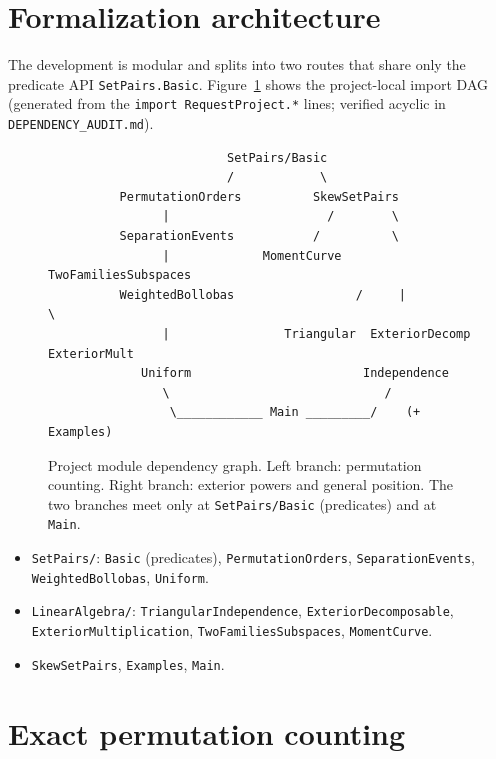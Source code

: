 \documentclass[11pt]{article}
\begin{document}
\section{Formalization architecture}\label{sec:arch}

The development is modular and splits into two routes that share only the predicate API
\lstinline{SetPairs.Basic}. Figure~\ref{fig:dep} shows the project-local import DAG
(generated from the \lstinline{import RequestProject.*} lines; verified acyclic in
\texttt{DEPENDENCY\_AUDIT.md}).

\begin{figure}[t]
\centering
\begin{verbatim}
                         SetPairs/Basic
                         /            \
          PermutationOrders          SkewSetPairs
                |                      /        \
          SeparationEvents           /          \
                |             MomentCurve   TwoFamiliesSubspaces
          WeightedBollobas                 /     |         \
                |                Triangular  ExteriorDecomp  ExteriorMult
             Uniform                        Independence
                \                              /
                 \____________ Main _________/    (+ Examples)
\end{verbatim}
\caption{Project module dependency graph. Left branch: permutation counting. Right
branch: exterior powers and general position. The two branches meet only at
\texttt{SetPairs/Basic} (predicates) and at \texttt{Main}.}
\label{fig:dep}
\end{figure}

\begin{itemize}
\item \texttt{SetPairs/}: \texttt{Basic} (predicates), \texttt{PermutationOrders},
  \texttt{SeparationEvents}, \texttt{WeightedBollobas}, \texttt{Uniform}.
\item \texttt{LinearAlgebra/}: \texttt{TriangularIndependence},
  \texttt{ExteriorDecomposable}, \texttt{ExteriorMultiplication},
  \texttt{TwoFamiliesSubspaces}, \texttt{MomentCurve}.
\item \texttt{SkewSetPairs}, \texttt{Examples}, \texttt{Main}.
\end{itemize}

\section{Exact permutation counting}\label{sec:count}
\end{document}
